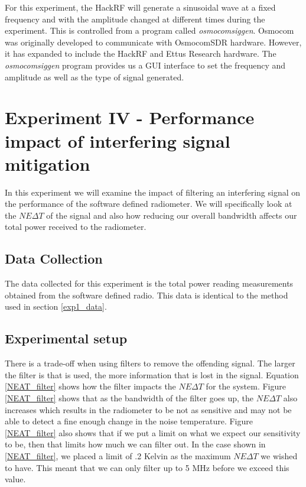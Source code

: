 For this experiment, the HackRF will generate a sinusoidal wave at a fixed frequency and with the amplitude changed at different times during the experiment.  This is controlled from a program called \emph{osmocomsiggen}.  Osmocom was originally developed to communicate with OsmocomSDR hardware.  However, it has expanded to include the HackRF and Ettus Research hardware.  The \emph{osmocomsiggen} program provides us a GUI interface to set the frequency and amplitude as well as the type of signal generated.  

\section{Experiment IV - Performance impact of interfering signal mitigation}\label{Exp4}
In this experiment we will examine the impact of filtering an interfering signal on the performance of the software defined radiometer.  We will specifically look at the $NE\Delta T$ of the signal and also how reducing our overall bandwidth affects our total power received to the radiometer.

\subsection{Data Collection}

The data collected for this experiment is the total power reading measurements obtained from the software defined radio.  This data is identical to the method used in section \ref{exp1_data}.

\subsection{Experimental setup} \label{exp4_setup}

There is a trade-off when using filters to remove the offending signal.  The larger the filter is that is used, the more information that is lost in the signal.  Equation \ref{NEAT_filter} shows how the filter impacts the $NE\Delta T$ for the system.  Figure \ref{NEAT_filter} shows that as the bandwidth of the filter goes up, the $NE\Delta T$ also increases which results in the radiometer to be not as sensitive and may not be able to detect a fine enough change in the noise temperature.  Figure \ref{NEAT_filter} also shows that if we put a limit on what we expect our sensitivity to be, then that limits how much we can filter out.  In the case shown in \ref{NEAT_filter}, we placed a limit of .2 Kelvin as the maximum $NE\Delta T$ we wished to have.  This meant that we can only filter up to 5 MHz before we exceed this value.

